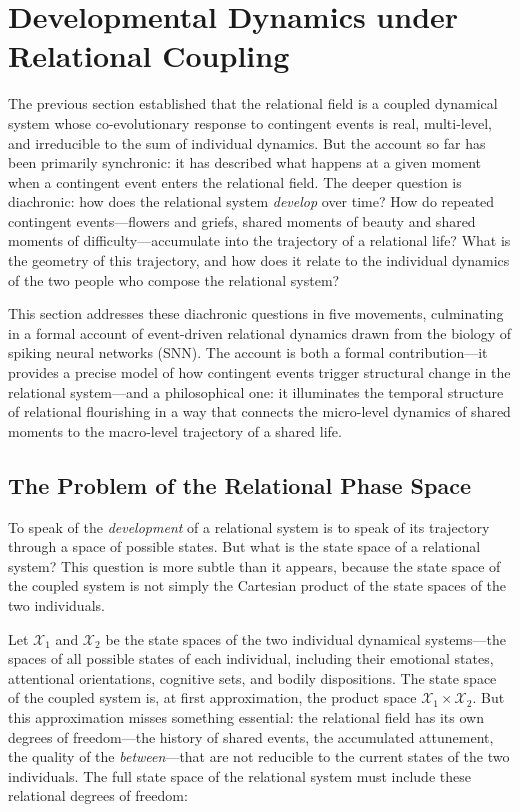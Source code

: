 \section{Developmental Dynamics under Relational Coupling}
\label{p14:sec:dynamics}

\noindent
The previous section established that the relational field is a coupled dynamical system whose co-evolutionary response to contingent events is real, multi-level, and irreducible to the sum of individual dynamics. But the account so far has been primarily synchronic: it has described what happens at a given moment when a contingent event enters the relational field. The deeper question is diachronic: how does the relational system \emph{develop} over time? How do repeated contingent events---flowers and griefs, shared moments of beauty and shared moments of difficulty---accumulate into the trajectory of a relational life? What is the geometry of this trajectory, and how does it relate to the individual dynamics of the two people who compose the relational system?

This section addresses these diachronic questions in five movements, culminating in a formal account of event-driven relational dynamics drawn from the biology of spiking neural networks (SNN). The account is both a formal contribution---it provides a precise model of how contingent events trigger structural change in the relational system---and a philosophical one: it illuminates the temporal structure of relational flourishing in a way that connects the micro-level dynamics of shared moments to the macro-level trajectory of a shared life.

\subsection{The Problem of the Relational Phase Space}
\label{p14:subsec:phasespace}

\noindent
To speak of the \emph{development} of a relational system is to speak of its trajectory through a space of possible states. But what is the state space of a relational system? This question is more subtle than it appears, because the state space of the coupled system is not simply the Cartesian product of the state spaces of the two individuals.

Let $\mathcal{X}_1$ and $\mathcal{X}_2$ be the state spaces of the two individual dynamical systems---the spaces of all possible states of each individual, including their emotional states, attentional orientations, cognitive sets, and bodily dispositions. The state space of the coupled system is, at first approximation, the product space $\mathcal{X}_1 \times \mathcal{X}_2$. But this approximation misses something essential: the relational field has its own degrees of freedom---the history of shared events, the accumulated attunement, the quality of the \emph{between}---that are not reducible to the current states of the two individuals. The full state space of the relational system must include these relational degrees of freedom:

